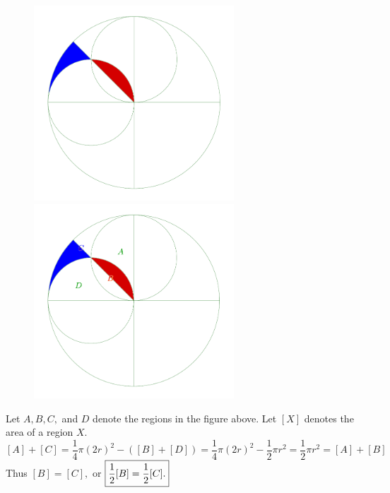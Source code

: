 \documentclass{article}
\begin{document}
\begin{figure}[h]
    \centering
    \begin{minipage}[t]{7.5cm}
        \begin{center}
            \includegraphics[width=7.5cm]{./svg/pdf/23-24-et-a-p3.pdf}
        \end{center}  
    \end{minipage}
    \qquad
    \begin{minipage}[t]{7.5cm}
        \centering
        \begin{center}
            \includegraphics[width=7.5cm]{./svg/pdf/23-24-et-a-p3-s.pdf}
        \end{center}  
    \end{minipage}
\end{figure}


\begin{soln}
    Let $A, B, C,$ and $D$ denote the regions in the figure above. Let $[X]$ denotes the area of a region $X.$
    \[
        [A] + [C] = \frac{1}{4} \pi (2r)^2 - ([B] + [D]) = \frac{1}{4} \pi (2r)^2 - \frac{1}{2} \pi r^2 = \frac{1}{2} \pi r^2 = [A] + [B]
    \]
    Thus $[B] = [C],$ or $\boxed{\frac{1}{2}[B]=\frac{1}{2}[C].}$
\end{soln}
\end{document}
